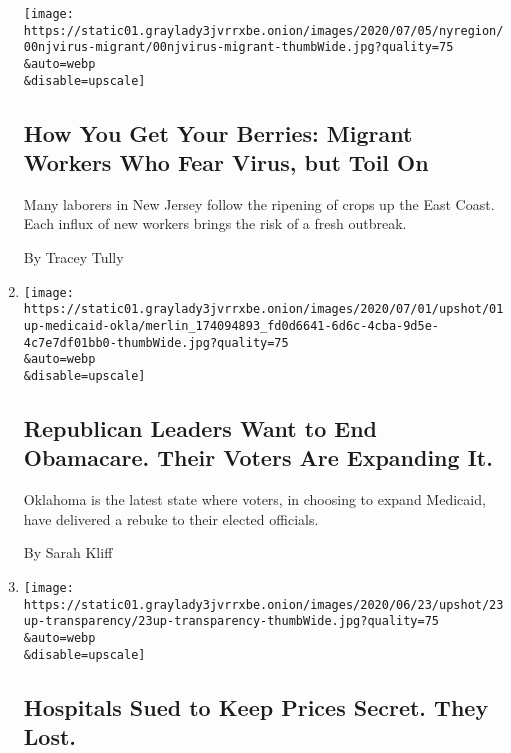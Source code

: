 \begin{enumerate}
  \texttt{[image: https://static01.graylady3jvrrxbe.onion/images/2020/07/05/nyregion/00njvirus-migrant/00njvirus-migrant-thumbWide.jpg?quality=75\\\&auto=webp\\\&disable=upscale]}

  \hypertarget{how-you-get-your-berries-migrant-workers-who-fear-virus-but-toil-on}{%
  \subsection{How You Get Your Berries: Migrant Workers Who Fear Virus,
  but Toil
  On}\label{how-you-get-your-berries-migrant-workers-who-fear-virus-but-toil-on}}

  Many laborers in New Jersey follow the ripening of crops up the East
  Coast. Each influx of new workers brings the risk of a fresh outbreak.

  By Tracey Tully
\item
  \href{/2020/07/01/upshot/oklahoma-obamacare-Republican-voters-expand.html}{}

  \texttt{[image: https://static01.graylady3jvrrxbe.onion/images/2020/07/01/upshot/01up-medicaid-okla/merlin\_174094893\_fd0d6641-6d6c-4cba-9d5e-4c7e7df01bb0-thumbWide.jpg?quality=75\\\&auto=webp\\\&disable=upscale]}

  \hypertarget{republican-leaders-want-to-end-obamacare-their-voters-are-expanding-it}{%
  \subsection{Republican Leaders Want to End Obamacare. Their Voters Are
  Expanding
  It.}\label{republican-leaders-want-to-end-obamacare-their-voters-are-expanding-it}}

  Oklahoma is the latest state where voters, in choosing to expand
  Medicaid, have delivered a rebuke to their elected officials.

  By Sarah Kliff
\item
  \href{/2020/06/23/upshot/hospitals-lost-price-transparency-lawsuit.html}{}

  \texttt{[image: https://static01.graylady3jvrrxbe.onion/images/2020/06/23/upshot/23up-transparency/23up-transparency-thumbWide.jpg?quality=75\\\&auto=webp\\\&disable=upscale]}

  \hypertarget{hospitals-sued-to-keep-prices-secret-they-lost}{%
  \subsection{Hospitals Sued to Keep Prices Secret. They
  Lost.}\label{hospitals-sued-to-keep-prices-secret-they-lost}}


\end{enumerate}

